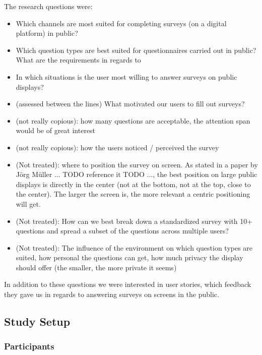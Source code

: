 	The research questions were:

	\begin{itemize}
	\item Which channels are most suited for completing surveys (on a digital platform) in public?
	\item Which question types are best suited for questionnaires carried out in public? What are the requirements in regards to 
	\item In which situations is the user most willing to answer surveys on public displays?
	\item (assessed between the lines) What motivated our users to fill out surveys?
	\item (not really copious): how many questions are acceptable, the attention span would be of great interest
	\item (not really copious): how the users noticed / perceived the survey
	\item (Not treated): where to position the survey on screen. As stated in a paper by J\"org M\"uller ... TODO reference it TODO ..., the best position on large public displays is directly in the center (not at the bottom, not at the top, close to the center). The larger the screen is, the more relevant a centric positioning will get.
	\item (Not treated): How can we best break down a standardized survey with 10+ questions and spread a subset of the questions across multiple users?
	\item (Not treated): The influence of the environment on which question types are suited, how personal the questions can get, how much privacy the display should offer (the smaller, the more private it seems)
	\end{itemize}

	In addition to these questions we were interested in user stories, which feedback they gave us in regards to answering surveys on screens in the public.




\subsection{Study Setup}

	\subsubsection{Participants}

